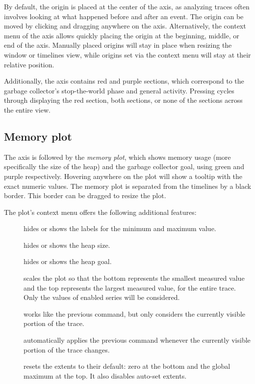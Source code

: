 \documentclass[10pt,letterpaper,oneside,openany,english]{memoir}
\newcommand{\noun}[1]{{\emph{#1}}}
\begin{document}
By default, the origin is placed at the center of the axis,
as analyzing traces often involves looking at what happened before and after an event.
The origin can be moved by clicking and dragging anywhere on the axis.
Alternatively, the context menu of the axis allows quickly placing the origin at the beginning, middle, or end of the axis.
Manually placed origins will stay in place when resizing the window or timelines view,
while origins set via the context menu will stay at their relative position.

Additionally, the axis contains red and purple sections,
which correspond to the garbage collector's stop-the-world phase and general activity.
Pressing  cycles through displaying the red section, both sections, or none of the sections across the entire view.

\subsection{Memory plot}

The axis is followed by the \noun{memory plot}, which shows memory usage (more specifically the size of the heap) and the garbage collector goal, using green and purple respectively.
Hovering anywhere on the plot will show a tooltip with the exact numeric values.
The memory plot is separated from the timelines by a black border.
This border can be dragged to resize the plot.

The plot's context menu offers the following additional features:

\begin{description}
\item[] hides or shows the labels for the minimum and maximum value.
\item[] hides or shows the heap size.
\item[] hides or shows the heap goal.
\item[] scales the plot so that the bottom represents the smallest measured value and the top represents the largest measured value, for the entire trace.
  Only the values of enabled series will be considered.
\item[] works like the previous command, but only considers the currently visible portion of the trace.
\item[] automatically applies the previous command whenever the currently visible portion of the trace changes.
\item[] resets the extents to their default: zero at the bottom and the global maximum at the top.
  It also disables auto-set extents.
\end{description}
\end{document}
